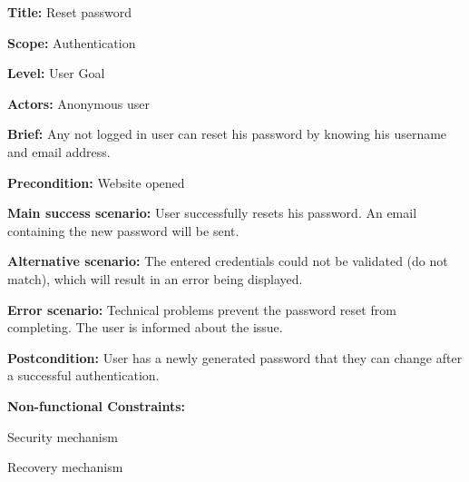 
\begin{DoxyItemize}
\item {\bfseries Title\+:} Reset password
\item {\bfseries Scope\+:} Authentication
\item {\bfseries Level\+:} User Goal
\item {\bfseries Actors\+:} Anonymous user
\item {\bfseries Brief\+:} Any not logged in user can reset his password by knowing his username and email address.
\end{DoxyItemize}


\begin{DoxyItemize}
\item {\bfseries Precondition\+:} Website opened
\item {\bfseries Main success scenario\+:} User successfully resets his password. An email containing the new password will be sent.
\item {\bfseries Alternative scenario\+:} The entered credentials could not be validated (do not match), which will result in an error being displayed.
\item {\bfseries Error scenario\+:} Technical problems prevent the password reset from completing. The user is informed about the issue.
\item {\bfseries Postcondition\+:} User has a newly generated password that they can change after a successful authentication.
\item {\bfseries Non-\/functional Constraints\+:}
\begin{DoxyItemize}
\item Security mechanism
\item Recovery mechanism 
\end{DoxyItemize}
\end{DoxyItemize}